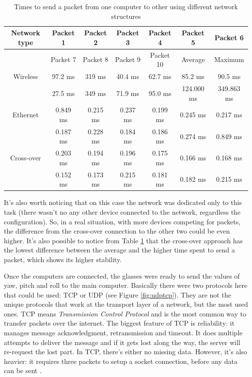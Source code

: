 \documentclass[msc, a4paper, classic, en]{ufbathesis}
\begin{document}
\begin{table}
\caption{Times to send a packet from one computer to other using different network structures}
\label{tab:ping}
\centering
\begin{tabular}{|c|c|c|c|c|c|c|}
\hline
Network type & Packet 1 & Packet 2 & Packet 3 & Packet 4 & Packet 5 & Packet 6 \\
\hline
             & Packet 7 & Packet 8 & Packet 9 & Packet 10 & Average & Maximum \\ 
\hline
Wireless & 97.2 ms & 319 ms & 40.4 ms & 62.7 ms & 85.2 ms & 90.5 ms \\
\hline
         & 27.5 ms & 349 ms & 71.9 ms & 95.0 ms & 124.000 ms & 349.863 ms \\
\hline
Ethernet & 0.849 ms & 0.215 ms & 0.237 ms & 0.199 ms & 0.245 ms & 0.217 ms \\
\hline
         & 0.187 ms & 0.228 ms & 0.184 ms & 0.186 ms & 0.274 ms & 0.849 ms \\
\hline
Cross-over & 0.203 ms & 0.194 ms & 0.196 ms & 0.175 ms & 0.166 ms & 0.168 ms \\
\hline
           & 0.152 ms & 0.173 ms & 0.215 ms & 0.181 ms & 0.182 ms & 0.215 ms \\
\hline
\end{tabular}
\end{table}

It's also worth noticing that on this case the network was dedicated only to this task (there wasn't no any other device connected to the network, regardless the configuration). So, in a real situation, with more devices competing for packets, the difference from the cross-over connection to the other two could be even higher. It's also possible to notice from Table \ref{tab:ping} that the cross-over approach has the lowest difference between the average and the higher time spent to send a packet, which shows its higher stability.

Once the computers are connected, the glasses were ready to send the values of yaw, pitch and roll to the main computer. Basically there were two protocols here that could be used: TCP or UDP (see Figure \ref{fig:udptcp}). They are not the unique protocols that work at the transport layer of a network, but the most used ones. TCP means \textit{Transmission Control Protocol} and is the most common way to transfer packets over the internet. The biggest feature of TCP is reliability: it manages message acknowledgment, retransmission and timeout. It does multiple attempts to deliver the message and if it gets lost along the way, the server will re-request the lost part. In TCP, there's either no missing data. However, it's also heavier: it requires three packets to setup a socket connection, before any data can be sent \cite{udp}.
\end{document}

